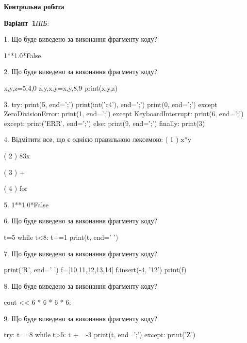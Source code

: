 \documentclass[11pt]{article}
\begin{document}
{\large\textbf{Контрольна робота}}

\textbf{Варіант \No\,1}\hfill \textit{ПІБ:}\,\underline{\hspace{60mm}}
\vspace{4mm}

1. Що буде виведено за виконання фрагменту коду?

1**1.0*False


2. Що буде виведено за виконання фрагменту коду?

x,y,z=5,4,0
z,y,x,y=x,y,8,9
print(x,y,z)


3. 
try:
    print(5, end=';')
    print(int('c4'), end=';')
    print(0, end=';')
except ZeroDivisionError:
    print(1, end=';')
except KeyboardInterrupt:
    print(6, end=';')
except:
    print('ERR', end=';')
else:
    print(9, end=';')
finally:
    print(3)


4. %
Відмітити все, що є однією правильною лексемою:
( 1 ) x*y

( 2 ) 83x

( 3 ) +

( 4 ) for


5. 
1**1.0*False

6. Що буде виведено за виконання фрагменту коду?

t=5
while t<8:
    t+=1
print(t, end=' ')



7. Що буде виведено за виконання фрагменту коду?

print('R', end=' ')
f=[10,11,12,13,14]
f.insert(-4, '12')
print(f)



8. Що буде виведено за виконання фрагменту коду?

cout << 6 * 6 * 6 * 6;


9. Що буде виведено за виконання фрагменту коду?

try:
    t = 8
    while t>5:
        t += -3
    print(t, end=';')
except:
    print('Z')


\end{document}
